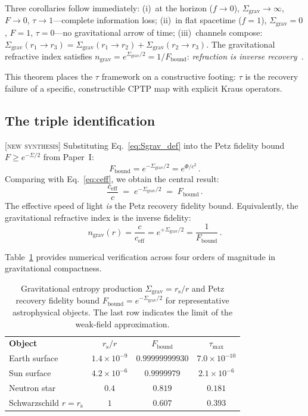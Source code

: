 \documentclass[prl,twocolumn,superscriptaddress,longbibliography,floatfix]{revtex4-2}
\newcommand{\tauasym}{\tau}
\newcommand{\ceff}{c_{\mathrm{eff}}}
\newcommand{\rs}{r_{\mathrm{s}}}
\newcommand{\Sgrav}{\Sigma_{\mathrm{grav}}}
\newcommand{\Fbound}{F_{\mathrm{bound}}}
\newcommand{\nref}{n_{\mathrm{grav}}}
\begin{document}
\medskip

Three corollaries follow immediately:
(i)~at the horizon ($f \to 0$), $\Sgrav \to \infty$,
$F \to 0$, $\tauasym \to 1$---complete information loss;
(ii)~in flat spacetime ($f = 1$), $\Sgrav = 0$, $F = 1$,
$\tauasym = 0$---no gravitational arrow of time;
(iii)~channels compose: $\Sgrav(r_1 \to r_3) =
\Sgrav(r_1 \to r_2) + \Sgrav(r_2 \to r_3)$.
The gravitational refractive index satisfies
$\nref = e^{\Sgrav/2} = 1/\Fbound$: \emph{refraction is
inverse recovery}~\cite{Dicke1957}.

This theorem places the $\tauasym$ framework on a
constructive footing:
$\tauasym$ is the recovery failure of a specific,
constructible CPTP map with explicit Kraus operators.

\subsection{The triple identification}

[\textsc{new synthesis}]  Substituting
Eq.~\eqref{eq:Sgrav_def} into the Petz fidelity bound
$F \geq e^{-\Sigma/2}$ from Paper~I:
\begin{equation}
  \Fbound = e^{-\Sgrav/2} = e^{\Phi/c^2}\,.
  \label{eq:Fbound}
\end{equation}
Comparing with Eq.~\eqref{eq:ceff}, we obtain the central
result:
\begin{equation}
  \boxed{\;\frac{\ceff}{c}
  \;=\; e^{-\Sgrav/2}
  \;=\; \Fbound\,.\;}
  \label{eq:triple}
\end{equation}
The effective speed of light \emph{is} the Petz recovery
fidelity bound.
Equivalently, the gravitational refractive index is the inverse
fidelity:
\begin{equation}
  \nref(r) = \frac{c}{\ceff} = e^{+\Sgrav/2} = \frac{1}{\Fbound}\,.
  \label{eq:refractive_index}
\end{equation}

Table~\ref{tab:numerical} provides numerical verification
across four orders of magnitude in gravitational compactness.

\begin{table}[t]
\caption{\label{tab:numerical}Gravitational entropy production
$\Sgrav = \rs/r$ and Petz recovery fidelity bound
$\Fbound = e^{-\Sgrav/2}$ for representative astrophysical
objects.  The last row indicates the limit of the weak-field
approximation.}
\begin{ruledtabular}
\begin{tabular}{lccc}
  \textbf{Object} & $\rs/r$ & $\Fbound$ & $\tauasym_{\max}$ \\
  \colrule
  Earth surface    & $1.4{\times}10^{-9}$ & $0.99999999930$
    & $7.0{\times}10^{-10}$ \\
  Sun surface      & $4.2{\times}10^{-6}$ & $0.9999979$
    & $2.1{\times}10^{-6}$ \\
  Neutron star     & $0.4$ & $0.819$
    & $0.181$ \\
  Schwarzschild $r\!=\!\rs$ & $1$ & $0.607$
    & $0.393$ \\
\end{tabular}
\end{ruledtabular}
\end{table}
\end{document}
